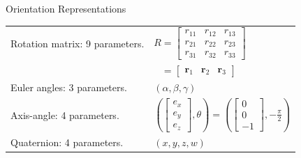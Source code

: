 \documentclass[aspectratio=169]{beamer}
\begin{document}
\begin{frame}[t]{Orientation Representations}
    \begin{tabular}{@{}m{}m{}@{}}
        Rotation matrix: 9 parameters.
        & $\displaystyle R=\begin{bmatrix}r_{11}&r_{12}&r_{13}\\r_{21}&r_{22}&r_{23}\\r_{31}&r_{32}&r_{33}\end{bmatrix}$\\[0.2cm]
        & $\displaystyle \phantom{R}=\begin{bmatrix}\mathbf r_1&\mathbf r_2&\mathbf r_3\end{bmatrix}$\\[0.35cm]
        Euler angles: 3 parameters.
        & $(\alpha,\beta,\gamma)$\\[0.35cm]
        Axis-angle: 4 parameters.
        & $\displaystyle\left(\begin{bmatrix}e_x\\e_y\\e_z\end{bmatrix},\theta\right)
        =\left(\begin{bmatrix}0\\0\\-1\end{bmatrix},-\frac{\pi}{2}\right)$\\[0.35cm]
        Quaternion: 4 parameters.
        & $(x,y,z,w)$
    \end{tabular}
\end{frame}
\end{document}

